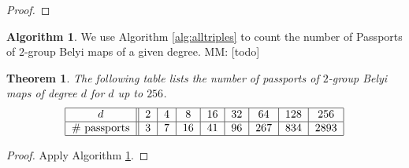 \documentclass{dcthesis}
\newcommand{\mm}[1]{{\color{blue} \sf MM: [#1]}}
\newtheorem{theorem}[prop]{Theorem}
\theoremstyle{definition}
\newtheorem{alg}[prop]{Algorithm}
\theoremstyle{remark}
\numberwithin{equation}{section}
\numberwithin{figure}{section}
\begin{document}
{{\begin{proof}
    \end{proof}
    \begin{alg}\label{alg:allpassports}
      We use Algorithm \ref{alg:alltriples}
      to count the number of Passports of $2$-group Belyi maps
      of a given degree.
      \mm{todo}
    \end{alg}
    \begin{theorem}\label{thm:passports}
      The following table lists the number of passports of
      $2$-group Belyi maps of degree $d$ for $d$ up to $256$.
      \[
        \begin{tabular}{|c||c|c|c|c|c|c|c|c|}
          \hline
          $d$ & $2$ & $4$ & $8$ & $16$ & $32$ & $64$ & $128$ & $256$\\
          \hline
          \# passports & $3$ & $7$ & $16$ & $41$ & $96$ & $267$ & $834$ & $2893$\\
          \hline
        \end{tabular}
      \]
    \end{theorem}
    \begin{proof}
      Apply Algorithm \ref{alg:allpassports}.
    \end{proof}
  }
}
\end{document}

